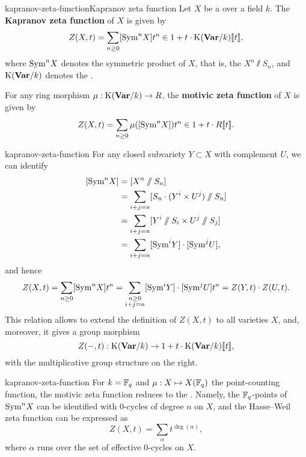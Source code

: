 \begin{topic}{kapranov-zeta-function}{Kapranov zeta function}
    Let $X$ be a  over a field $k$. The \textbf{Kapranov zeta function} of $X$ is given by
    \[ Z(X, t) = \sum_{n \ge 0} [\textup{Sym}^n X] t^n \in 1 + t \cdot \textup{K}(\textbf{Var}/k) \llbracket t \rrbracket , \]
    where $\textup{Sym}^n X$ denotes the symmetric product of $X$, that is, the  $X^n \sslash S_n$, and $\textup{K}(\textbf{Var}/k)$ denotes the .
    
    For any ring morphism $\mu : \textup{K}(\textbf{Var}/k) \to R$, the \textbf{motivic zeta function} of $X$ is given by
    \[ Z(X, t) = \sum_{n \ge 0} \mu([\textup{Sym}^n X]) t^n \in 1 + t \cdot R \llbracket t \rrbracket . \]
\end{topic}

\begin{example}{kapranov-zeta-function}
    For any closed subvariety $Y \subset X$ with complement $U$, we can identify
    \[ \begin{aligned}
        [\textup{Sym}^n X]
            &= [X^n \sslash S_n] \\
            &= \sum_{i + j = n} [S_n \cdot (Y^i \times U^j) \sslash S_n] \\
            &= \sum_{i + j = n} [Y^i \sslash S_i \times U^j \sslash S_j] \\
            &= \sum_{i + j = n} [ \textup{Sym}^i Y] \cdot [ \textup{Sym}^j U ] ,
    \end{aligned} \]
    and hence
    \[ Z(X, t) = \sum_{n \ge 0} [\textup{Sym}^n X] t^n = \sum_{\substack{n \ge 0 \\ i + j = n}} [\textup{Sym}^i Y] \cdot [\textup{Sym}^j U] t^n = Z(Y, t) \cdot Z(U, t) . \]
    This relation allows to extend the definition of $Z(X, t)$ to all varieties $X$, and, moreover, it gives a group morphism
    \[ Z(-, t) : \textup{K}(\textbf{Var}/k) \to 1 + t \cdot \textup{K}(\textbf{Var}/k) \llbracket t \rrbracket , \]
    with the multiplicative group structure on the right.
\end{example}

\begin{example}{kapranov-zeta-function}
    For $k = \mathbb{F}_q$ and $\mu : X \mapsto X(\mathbb{F}_q)$ the point-counting function, the motivic zeta function reduces to the . Namely, the $\mathbb{F}_q$-points of $\textup{Sym}^n X$ can be identified with $0$-cycles of degree $n$ on $X$, and the Hasse--Weil zeta function can be expressed as
    \[ Z(X, t) = \sum_{\alpha} t^{\deg(\alpha)} , \]
    where $\alpha$ runs over the set of effective $0$-cycles on $X$.
\end{example}


